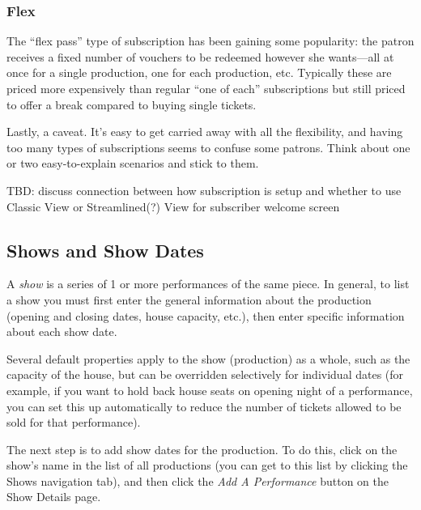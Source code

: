 \subsubsection{Flex}

The ``flex pass'' type of subscription has been gaining some popularity:
the patron receives a fixed number of vouchers to be redeemed however
she wants---all at once for a single production, one for each
production, etc.  Typically these are priced more expensively than
regular ``one of each'' subscriptions but still priced to offer a break
compared to buying single tickets.

Lastly, a caveat.  It's easy to get carried away with all the
flexibility, and having too many types of subscriptions seems to confuse
some patrons.  Think about one or two easy-to-explain scenarios and
stick to them.

TBD: discuss connection between how subscription is setup and whether to
use Classic View or Streamlined(?) View for subscriber welcome screen

\subsection{Shows and Show Dates}
\label{sec:shows-and-showdates}

A \emph{show} is a series of 1 or more performances of the same piece.
In general, to list a show you must first enter the general information
about the production (opening and closing dates, house capacity, etc.),
then enter specific information about each show date.

Several default properties apply to the show (production) as a whole,
such as the capacity of the house, but can be overridden selectively for
individual dates (for example, if you want to hold back house seats on
opening night of a performance, you can set this up automatically to
reduce the number of tickets allowed to be sold for that performance).

\label{sec:addingshows}
\label{sec:addingshowdates}

The next step is to add show dates for the production.  To do this,
click on the show's name in the list of all productions (you can get to
this list by clicking the Shows navigation tab), and then click
the \emph{Add A Performance} button on the Show Details page.

